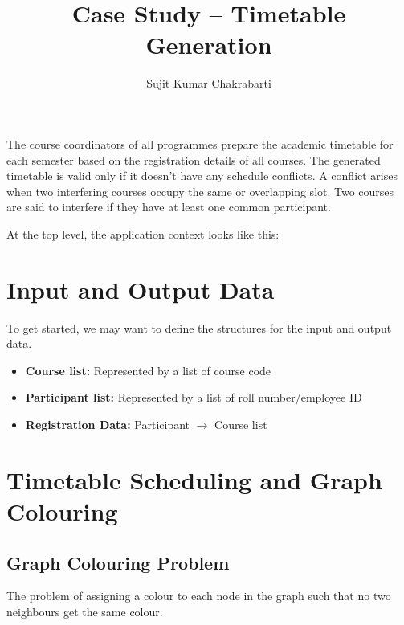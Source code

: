 \documentclass[12pts]{article}
\author{Sujit Kumar Chakrabarti}
\title{Case Study -- Timetable Generation}
\begin{document}
\maketitle

The course coordinators of all programmes prepare the academic timetable for each semester based on the registration details of all courses. The generated timetable is valid only if it doesn't have any schedule conflicts. A conflict arises when two interfering courses occupy the same or overlapping slot. Two courses are said to interfere if they have at least one common participant.

At the top level, the application context looks like this:

\begin{center}
\end{center}

\section*{Input and Output Data}
To get started, we may want to define the structures for the input and output data.

\begin{itemize}
\item \textbf{Course list:} Represented by a list of course code
\item \textbf{Participant list:} Represented by a list of roll number/employee ID
\item \textbf{Registration Data:} Participant $\longrightarrow$ Course list
\end{itemize}

\section*{Timetable Scheduling and Graph Colouring}
\subsection*{Graph Colouring Problem}
The problem of assigning a colour to each node in the graph such that no two neighbours get the same colour.
\end{document}
